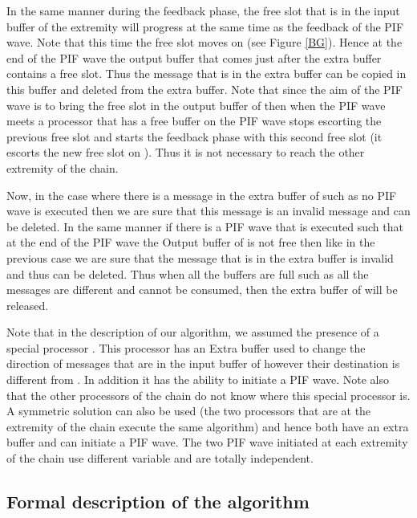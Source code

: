 \documentclass{llncs}
\begin{document}
 In the same manner during the feedback phase, the free slot that is in the input buffer of the extremity  will
progress at the same time as the feedback of the PIF wave. Note that this time the free slot moves on  (see Figure
\ref{BG}). Hence at the end of the PIF wave the output buffer that comes just after the extra buffer contains a free
slot. Thus the message that is in the extra buffer can be copied in this buffer and deleted from the extra buffer.
Note that since the aim of the PIF wave is to bring the free slot in the output buffer of  then when the PIF
wave meets a processor that has a free buffer on  the PIF wave stops escorting the previous free slot and starts
the feedback phase with this second free slot (it escorts the new free slot on ). Thus it is not necessary to
reach the other extremity of the chain.





Now, in the case where there is a message in the extra buffer of  such as no PIF wave is executed then we are
sure that this message is an invalid message and can be deleted. In the same manner if there is a PIF wave that is
executed such that at the end of the PIF wave the Output buffer of  is not free then like in the previous case
we are sure that the message that is in the extra buffer is invalid and thus can be deleted. Thus when all the buffers are full such as all the messages are different and cannot be consumed, then the extra buffer of  will be released. 

Note that in the description of our algorithm, we assumed the presence of a special processor . This processor has an Extra buffer used to change the direction of messages that are in the input buffer of  however their destination is different from . In addition it has the ability to initiate a PIF wave. Note also that the other processors of the chain do not know where this special processor is. A symmetric solution can also be used (the two processors that are at the extremity of the chain execute the same algorithm) and hence both have an extra buffer and can initiate a PIF wave. The two PIF wave initiated at each extremity of the chain use different variable and are totally independent. 







\subsection{Formal description of the algorithm}
\end{document}
